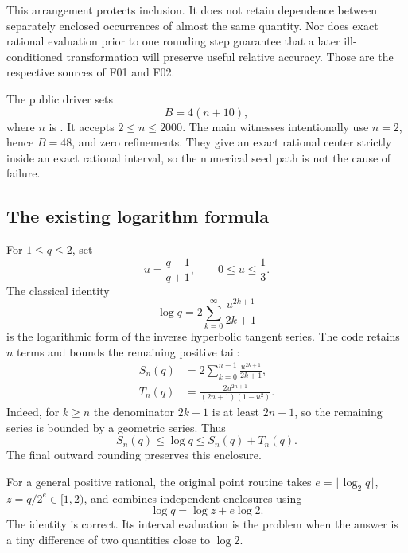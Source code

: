\documentclass[11pt,letterpaper]{article}
\newcommand{\code}[1]{\texttt{\detokenize{#1}}}
\theoremstyle{remark}\newtheorem{remark}[proposition]{Remark}
\begin{document}
This arrangement protects inclusion. It does not retain dependence between
separately enclosed occurrences of almost the same quantity. Nor does exact
rational evaluation prior to one rounding step guarantee that a later
ill-conditioned transformation will preserve useful relative accuracy.
Those are the respective sources of F01 and F02.

The public driver sets
\begin{equation}\label{eq:bits}
 B=4(n+10),
\end{equation}
where $n$ is \code{"EnclosureOrder"}. It accepts $2\le n\le2000$.
The main witnesses intentionally use $n=2$, hence $B=48$, and zero
refinements. They give an exact rational center strictly inside an exact
rational interval, so the numerical seed path is not the cause of failure.

\subsection{The existing logarithm formula}
For $1\le q\le2$, set
\[
 u=\frac{q-1}{q+1},\qquad 0\le u\le\frac13.
\]
The classical identity
\begin{equation}\label{eq:atanh}
 \log q=2\sum_{k=0}^{\infty}\frac{u^{2k+1}}{2k+1}
\end{equation}
is the logarithmic form of the inverse hyperbolic tangent series.\cite{dlmf}
The code retains $n$ terms and bounds the remaining positive tail:
\begin{align}
 S_n(q)&=2\sum_{k=0}^{n-1}\frac{u^{2k+1}}{2k+1},\label{eq:sum}\\
 T_n(q)&=\frac{2u^{2n+1}}{(2n+1)(1-u^2)}.\label{eq:tail}
\end{align}
Indeed, for $k\ge n$ the denominator $2k+1$ is at least $2n+1$, so the
remaining series is bounded by a geometric series. Thus
\begin{equation}\label{eq:unitbound}
 S_n(q)\le\log q\le S_n(q)+T_n(q).
\end{equation}
The final outward rounding preserves this enclosure.

For a general positive rational, the original point routine takes
$e=\lfloor\log_2q\rfloor$, $z=q/2^e\in[1,2)$, and combines independent
enclosures using
\begin{equation}\label{eq:reduction}
 \log q=\log z+e\log2.
\end{equation}
The identity is correct. Its interval evaluation is the problem when the
answer is a tiny difference of two quantities close to $\log2$.
\end{document}
